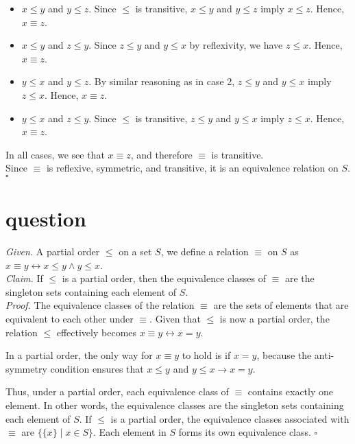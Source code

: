 \documentclass[11pt]{article}
\begin{document}
\begin{itemize}
    \renewcommand{\labelitemi}{$\hookrightarrow$}
    \item \( x \leq y \) and \( y \leq z \).
        Since \( \leq \) is transitive, \( x \leq y \) and \( y \leq z \) imply \( x \leq z \). Hence, \( x \equiv z \).

    \item \( x \leq y \) and \( z \leq y \).  Since \( z \leq y \) and \( y \leq x \) by reflexivity, we have \( z \leq x \). Hence, \( x \equiv z \).

    \item \( y \leq x \) and \( y \leq z \). By similar reasoning as in case 2, \( z \leq y \) and \( y \leq x \) imply \( z \leq x \). Hence, \( x \equiv z \).
    
    \item \( y \leq x \) and \( z \leq y \). Since \( \leq \) is transitive, \( z \leq y \) and \( y \leq x \) imply \( z \leq x \). Hence, \( x \equiv z \).
\end{itemize}
In all cases, we see that \( x \equiv z \), and therefore \( \equiv \) is transitive. \\
Since \( \equiv \) is reflexive, symmetric, and transitive, it is an equivalence relation on \( S \). \hfill \( \square \)






\section{question}
\emph{Given. } A partial order $\leq$ on a set $S$, we define a relation $\equiv$ on $S$ as $x \equiv y \leftrightarrow x \leq y \land y \leq x$. \medskip \\
\emph{Claim. } If $\leq$ is a partial order, then the equivalence classes of $\equiv$ are the singleton sets containing each element of $S$.  \medskip \\
\emph{Proof. }
The equivalence classes of the relation $\equiv$ are the sets of elements that are equivalent to each other under $\equiv$. Given that $\leq$ is now a partial order, the relation $\leq$ effectively becomes $ x \equiv y \leftrightarrow x = y.$

In a partial order, the only way for $x \equiv y$ to hold is if $x=y$, because the anti-symmetry condition ensures that $x \leq y$ and $y \leq x \rightarrow x=y$.

Thus, under a partial order, each equivalence class of $\equiv$ contains exactly one element. In other words, the equivalence classes are the singleton sets containing each element of $S$.
If $\leq$ is a partial order, the equivalence classes associated with $\equiv$ are
$
\{ \{x\} \mid x \in S \}
$. 
Each element in $S$ forms its own equivalence class. \hfill $\square$
\end{document}
